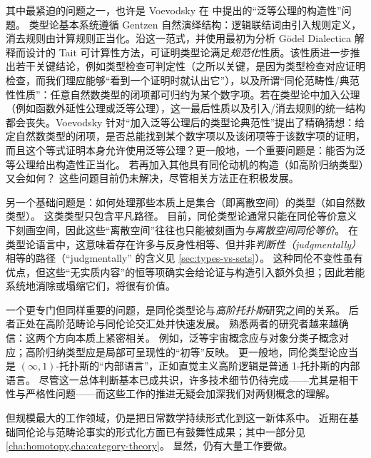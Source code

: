 %
其中最紧迫的问题之一，也许是 Voevodsky 在 \cite{Universe-poly} 中提出的“泛等公理的构造性”问题。
类型论基本系统遵循 Gentzen 自然演绎结构：逻辑联结词由引入规则定义，消去规则由计算规则正当化。沿这一范式，并使用最初为分析 G\"odel Dialectica 解释而设计的 Tait 可计算性方法，可证明类型论满足\emph{规范化}性质。该性质进一步推出若干关键结论，例如类型检查可判定性（之所以关键，是因为类型检查对应证明检查，而我们理应能够“看到一个证明时就认出它”），以及所谓“同伦范畴性/典范性性质”：任意自然数类型的闭项都可归约为某个数字项。若在类型论中加入公理（例如函数外延性公理或泛等公理），这一最后性质以及引入/消去规则的统一结构都会丧失。Voevodsky 针对“加入泛等公理后的类型论典范性”提出了精确猜想：给定自然数类型的闭项，是否总能找到某个数字项以及该闭项等于该数字项的证明，而且这个等式证明本身允许使用泛等公理？更一般地，一个重要问题是：能否为泛等公理给出构造性正当化。
若再加入其他具有同伦动机的构造（如高阶归纳类型）又会如何？
这些问题目前仍未解决，尽管相关方法正在积极发展。

另一个基础问题是：如何处理那些本质上是集合（即离散空间）的类型（如自然数类型）。
%
这类类型只包含平凡路径。
目前，同伦类型论通常只能在同伦等价意义下刻画空间，因此这些“离散空间”往往也只能被刻画为\emph{与离散空间同伦等价}。
在类型论语言中，这意味着存在许多与反身性相等、但并非\emph{判断性（judgmentally）}相等的路径（“judgmentally” 的含义见 \cref{sec:types-vs-sets}）。
这种同伦不变性虽有优点，但这些“无实质内容”的恒等项确实会给论证与构造引入额外负担；因此若能系统地消除或塌缩它们，将很有价值。

一个更专门但同样重要的问题，是同伦类型论与\emph{高阶托扑斯}研究之间的关系。%
后者正处在高阶范畴论与同伦论交汇处并快速发展。
熟悉两者的研究者越来越确信：这两个方向本质上紧密相关。
例如，泛等宇宙概念应与对象分类子概念对应；高阶归纳类型应是局部可呈现性的“初等”反映。
更一般地，同伦类型论应当是 $(\infty,1)$-托扑斯的“内部语言”，正如直觉主义高阶逻辑是普通 1-托扑斯的内部语言。
尽管这一总体判断基本已成共识，许多技术细节仍待完成——尤其是相干性与严格性问题——而这些工作的推进无疑会加深我们对两侧概念的理解。

%
但规模最大的工作领域，仍是把日常数学持续形式化到这一新体系中。
近期在基础同伦论与范畴论事实的形式化方面已有鼓舞性成果；其中一部分见 \cref{cha:homotopy,cha:category-theory}。
显然，仍有大量工作要做。

